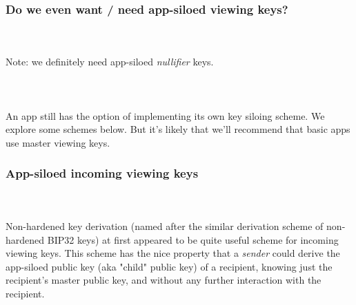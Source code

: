 \subsubsection{Do we even want / need app-siloed viewing keys?}\hfill\\
\\
Note: we definitely need app-siloed \textit{nullifier} keys.\\
\\
\\
\\
An app still has the option of implementing its own key siloing scheme.
We explore some schemes below.
But it's likely that we'll recommend that basic apps use master viewing keys.



\subsubsection{App-siloed incoming viewing keys}


\hfill\\
\\
Non-hardened key derivation (named after the similar derivation scheme of non-hardened BIP32 keys) at first appeared to be quite useful scheme for incoming viewing keys.
This scheme has the nice property that a \textit{sender} could derive the app-siloed public key (aka "child" public key) of a recipient, knowing just the recipient's master public key, and without any further interaction with the recipient.

